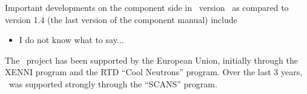 Important developments on the component side in \MCS\ version \version\ 
as compared to version 1.4 (the last version of the component manual) include

\begin{itemize}
\item I do not know what to say...
\end{itemize} 

The \MCS\ project has been supported by the European Union, initially
through the XENNI program and the RTD ``Cool Neutrons'' program.
Over the last 3 years, \MCS\ was supported strongly through the
``SCANS'' program.






